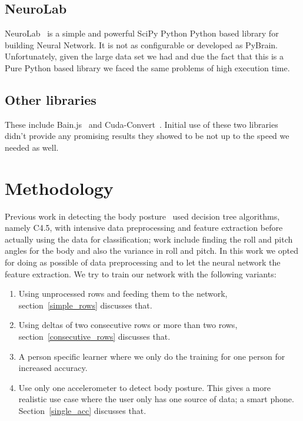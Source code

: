 \documentclass{article}
\begin{document}
\subsection{NeuroLab}
NeuroLab~\cite{NeuroLab:Online} is a simple and powerful SciPy Python Python based library for building Neural Network. It is not as 
configurable or developed as PyBrain. Unfortunately, given the large data set we had and due the fact that this is a Pure Python 
based library we faced the same problems of high execution time. 

\subsection{Other libraries}
These include Bain.js~\cite{BrainJs} and Cuda-Convert~\cite{Cuda-convert}. Initial use of these two libraries didn't provide any promising
results they showed to be not up to the speed we needed  as well.  


\section{Methodology}
\label{methodology}

Previous work in detecting the body posture~\cite{ugulino2012wearable} used decision tree algorithms, namely C4.5, with intensive 
data preprocessing and feature extraction before actually using the data for classification; work include finding the roll and 
pitch angles for the body and also the variance in roll and pitch. In this work we opted for doing as possible of data preprocessing
and to let the neural network the feature extraction. We try to train our network with the following variants:

\begin{enumerate}
  \item Using unprocessed rows and feeding them to the network, section~\ref{simple_rows} discusses that.
  \item Using deltas of two consecutive rows or more than two rows, section~\ref{consecutive_rows} discusses that. 
  \item A person specific learner where we only do the training for one person for increased accuracy. 
  \item Use only one accelerometer to detect body posture. This gives a more realistic use case where the user only 
        has one source of data; a smart phone. Section~\ref{single_acc} discusses that.
\end{enumerate}  
\end{document}
